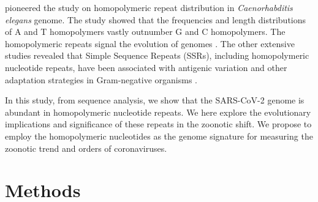 \documentclass{article}
\numberwithin{equation}{section}
\begin{document}
\cite{denver2004abundance} pioneered the study on homopolymeric repeat distribution in \textit{Caenorhabditis elegans} genome. The study showed that the frequencies and length distributions of A and T homopolymers vastly outnumber G and C homopolymers. The homopolymeric repeats signal the evolution of genomes \cite{denver2004abundance}. The other extensive studies revealed that Simple Sequence Repeats (SSRs), including homopolymeric nucleotide repeats, have been associated with antigenic variation and other adaptation strategies in Gram-negative organisms \citep{janulczyk2010simple}.

In this study, from sequence analysis, we show that the SARS-CoV-2 genome is abundant in homopolymeric nucleotide repeats. We here explore the evolutionary implications and significance of these repeats in the zoonotic shift. We propose to employ the homopolymeric nucleotides as the genome signature for measuring the zoonotic trend and orders of coronaviruses. 

\section{Methods}
\end{document}

